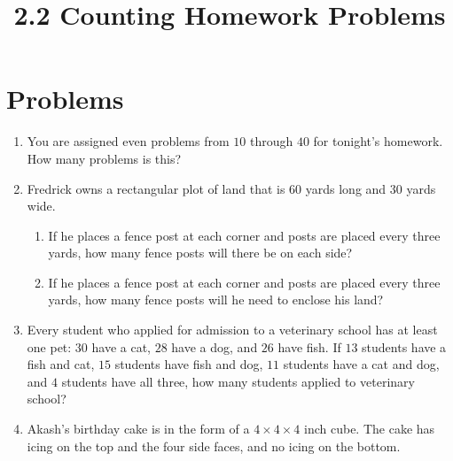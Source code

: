 \documentclass{article}
\title{2.2 Counting Homework Problems}
\author{}
\date{}
\begin{document}
\maketitle
\section*{Problems}

\begin{enumerate}
	\item You are assigned even problems from $10$ through $40$ for tonight's 
		homework. How many problems is this?
		\vspace{3cm}
    \item Fredrick owns a rectangular plot of land that is $60$ yards long and 
    $30$ yards wide.
    \begin{enumerate}
        \item If he places a fence post at each corner and posts are placed 
            every three yards, how many fence posts will there be on each 
            side?
            \vspace{3cm}
        \item If he places a fence post at each corner and posts are placed 
            every three yards, how many fence posts will he need to enclose 
            his land?
            \vspace{3cm}
    \end{enumerate}
    \item Every student who applied for admission to a veterinary school has 
    at least one pet: $30$ have a cat, $28$ have a dog, and $26$ have 
    fish. If $13$ students have a fish and cat, $15$ students have 
    fish and dog, $11$ students have a cat and dog, and $4$ 
    students have all three, how many students applied to 
    veterinary school? 
    \begin{center}
    \end{center}
    \vspace{3cm}
    \item Akash's birthday cake is in the form of a $4 \times 4 \times 4$ inch cube.
        The cake has icing on the top and the four side faces, and no icing on the bottom.

\end{enumerate}
\end{document}
